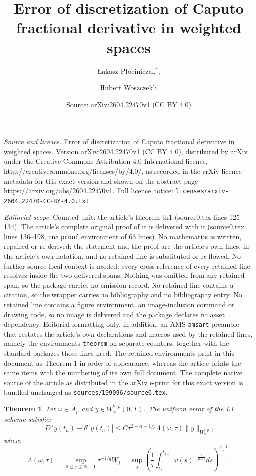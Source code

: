 \documentclass[10pt,a4paper]{amsart}
\title{Error of discretization of Caputo fractional derivative in weighted spaces}
\author{\L{}ukasz P\l{}ociniczak$^*$, \and Hubert Woszczek$^{*, }$}
\date{Source: arXiv:2604.22470v1 (CC BY 4.0)}
\newtheorem{theorem}{Theorem}
\begin{document}
\maketitle

\noindent\emph{Source and licence.} Error of discretization of Caputo fractional derivative in weighted spaces. Version arXiv:2604.22470v1 (CC BY 4.0), distributed by arXiv under the Creative Commons Attribution 4.0 International licence, http://creativecommons.org/licenses/by/4.0/, as recorded in the arXiv licence metadata for this exact version and shown on the abstract page https://arxiv.org/abs/2604.22470v1. Full licence notice: \texttt{licenses/arxiv-2604.22470-CC-BY-4.0.txt}.\par\smallskip

\noindent\textit{Editorial scope.} Counted unit: the article's theorem th1 (source0.tex lines 125--134). The article's complete original proof of it is delivered with it (source0.tex lines 136--198, one \texttt{proof} environment of 63 lines). No mathematics is written, repaired or re-derived: the statement and the proof are the article's own lines, in the article's own notation, and no retained line is substituted or re-flowed.  No further source-local context is needed: every cross-reference of every retained line resolves inside the two delivered spans.  Nothing was omitted from any retained span, so the package carries no omission record.  No retained line contains a citation, so the wrapper carries no bibliography and no bibliography entry.  No retained line contains a figure environment, an image-inclusion command or drawing code, so no image is delivered and the package declares no asset dependency.  Editorial formatting only, in addition: an AMS \texttt{amsart} preamble that restates the article's own declarations and macros used by the retained lines, namely the environments \texttt{theorem} on separate counters, together with the standard packages those lines need.  The retained environments print in this document as Theorem 1 in order of appearance, whereas the article prints the same items with the numbering of its own full document.  The complete native source of the article as distributed in the arXiv e-print for this exact version is bundled unchanged as \texttt{sources/199096/source0.tex}.
\begin{theorem}\label{th1}
Let $\omega \in A_p$ and $y \in W^{2,p}_\omega(0,T)$. The uniform error of the L1 scheme satisfies
\begin{equation}
    |D^\alpha y(t_n) - \delta_\tau^\alpha y(t_n)| \le C \tau^{2-\alpha-1/p} \Lambda(\omega, \tau) \|y\|_{W^{2,p}_\omega},
\end{equation}
where
\begin{equation}
    \Lambda(\omega, \tau) = \sup_{0 \le j \le N-1} \tau^{-1/q} W_j = \sup_{j} \left( \frac{1}{\tau} \int_{t_j}^{t_{j+1}} \omega(s)^{-\frac{1}{p-1}} ds \right)^{\frac{p-1}{p}}.
\end{equation}
\end{theorem}
\end{document}
